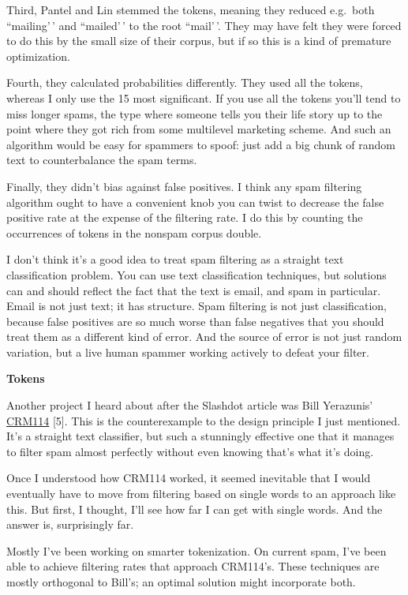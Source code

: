 Third, Pantel and Lin stemmed the tokens, meaning they reduced e.g.~both
``mailing'\,' and ``mailed'\,' to the root ``mail'\,'. They may have
felt they were forced to do this by the small size of their corpus, but
if so this is a kind of premature optimization.

Fourth, they calculated probabilities differently. They used all the
tokens, whereas I only use the 15 most significant. If you use all the
tokens you'll tend to miss longer spams, the type where someone tells
you their life story up to the point where they got rich from some
multilevel marketing scheme. And such an algorithm would be easy for
spammers to spoof: just add a big chunk of random text to counterbalance
the spam terms.

Finally, they didn't bias against false positives. I think any spam
filtering algorithm ought to have a convenient knob you can twist to
decrease the false positive rate at the expense of the filtering rate. I
do this by counting the occurrences of tokens in the nonspam corpus
double.

I don't think it's a good idea to treat spam filtering as a straight
text classification problem. You can use text classification techniques,
but solutions can and should reflect the fact that the text is email,
and spam in particular. Email is not just text; it has structure. Spam
filtering is not just classification, because false positives are so
much worse than false negatives that you should treat them as a
different kind of error. And the source of error is not just random
variation, but a live human spammer working actively to defeat your
filter.

\textbf{Tokens}

Another project I heard about after the Slashdot article was Bill
Yerazunis' \href{http://crm114.sourceforge.net}{CRM114} {[}5{]}. This is
the counterexample to the design principle I just mentioned. It's a
straight text classifier, but such a stunningly effective one that it
manages to filter spam almost perfectly without even knowing that's what
it's doing.

Once I understood how CRM114 worked, it seemed inevitable that I would
eventually have to move from filtering based on single words to an
approach like this. But first, I thought, I'll see how far I can get
with single words. And the answer is, surprisingly far.

Mostly I've been working on smarter tokenization. On current spam, I've
been able to achieve filtering rates that approach CRM114's. These
techniques are mostly orthogonal to Bill's; an optimal solution might
incorporate both.

